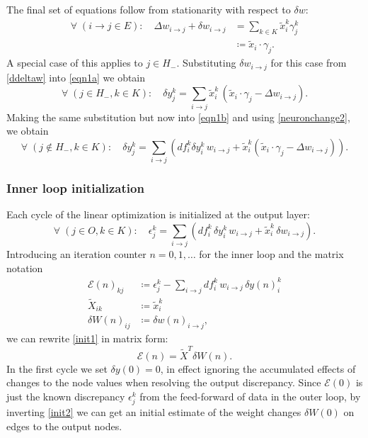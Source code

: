 \documentclass[12pt]{article}
\begin{document}
The final set of equations follow from stationarity with respect to $\delta w$:
\begin{align}\label{ddeltaw}
\forall\; (i\to j\in E):\quad \Delta w_{i\to j}+\delta w_{i\to j}&=\sum_{k\in K}\tilde{x}^k_i\gamma^k_j\\
&\coloneqq \tilde{x}_i\cdot \gamma_j.
\end{align}
A special case of this applies to $j\in H_-$. Substituting $\delta w_{i\to j}$ for this case from \eqref{ddeltaw} into \eqref{eqn1a} we obtain
\begin{equation}\label{deltayinit}
\forall\; (j\in H_-, k\in K):\quad\delta y^k_j=\sum_{i\to j}\tilde{x}^k_i\, \left(\tilde{x}_i\cdot \gamma_j-\Delta w_{i\to j}\right).
\end{equation}
Making the same substitution but now into \eqref{eqn1b} and using \eqref{neuronchange2}, we obtain
\begin{equation}\label{forwardprop}
\forall\; (j\notin H_-, k\in K):\quad\delta y^k_j=\sum_{i\to j}\left(df^k_i\delta y^k_i\,w_{i\to j}
+\tilde{x}^k_i (\tilde{x}_i\cdot \gamma_j-\Delta w_{i\to j})\right).
\end{equation}


\subsubsection*{Inner loop initialization}

Each cycle of the linear optimization is initialized at the output layer:
\begin{equation}\label{init1}
\forall\; (j\in O, k\in K):\quad\epsilon^k_j=\sum_{i\to j} \left(df^k_i\,\delta y^k_i\,w_{i\to j}+\tilde{x}^k_i\, \delta w_{i \to j}\right).
\end{equation}
Introducing an iteration counter $n=0,1,\ldots$ for the inner loop and the matrix notation
\begin{align}
\mathcal{E}(n)_{k j}&\coloneqq\epsilon^k_j-\sum_{i\to j}df^k_i\,w_{i\to j}\,{\delta y(n)}^k_i\label{E(n)}\\
\widetilde{X}_{i k}&\coloneqq\tilde{x}^k_i \\
\delta W(n)_{i j}&\coloneqq\delta w(n)_{i\to j},
\end{align}
we can rewrite \eqref{init1} in matrix form:
\begin{equation}\label{init2}
\mathcal{E}(n)=\widetilde{X}^T \delta W(n).
\end{equation}
In the first cycle we set $\delta y(0)=0$, in effect ignoring the accumulated effects of changes to the node values when resolving the output discrepancy. Since $\mathcal{E}(0)$ is just the known discrepancy $\epsilon^k_j$ from the feed-forward of data in the outer loop, by inverting \eqref{init2} we can get an initial estimate of the weight changes $\delta W(0)$ on edges to the output nodes.
\end{document}
